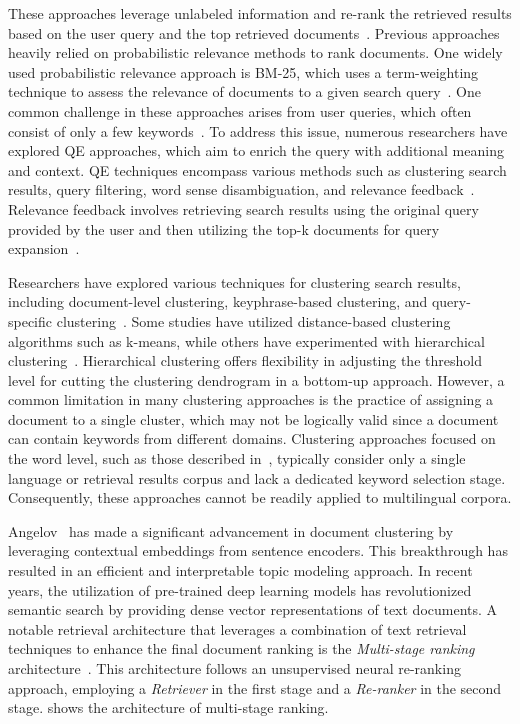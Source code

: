 These approaches leverage unlabeled information and re-rank the retrieved results based on the user query and the top retrieved documents~\cite{rohatgi2020psu, azad2019query}. Previous approaches heavily relied on probabilistic relevance methods to rank documents. One widely used probabilistic relevance approach is BM-25, which uses a term-weighting technique to assess the relevance of documents to a given search query~\cite{robertson2009probabilistic}. One common challenge in these approaches arises from user queries, which often consist of only a few keywords~\cite{azad2019query, Kankaria2015QueryET}. To address this issue, numerous researchers have explored \ac{QE} approaches, which aim to enrich the query with additional meaning and context. \ac{QE} techniques encompass various methods such as clustering search results, query filtering, word sense disambiguation, and relevance feedback~\cite{azad2019query}. Relevance feedback involves retrieving search results using the original query provided by the user and then utilizing the top-k documents for query expansion~\cite{azad2019query}.

Researchers have explored various techniques for clustering search results, including document-level clustering, keyphrase-based clustering, and query-specific clustering~\cite{bernardini2009full, kurland2008rank, zamir1998web, osinski2005concept, liu2004cluster, liu2006representing}. Some studies have utilized distance-based clustering algorithms such as k-means, while others have experimented with hierarchical clustering~\cite{bernardini2009full, mehlitz2007new, yuan2022measurement}. Hierarchical clustering offers flexibility in adjusting the threshold level for cutting the clustering dendrogram in a bottom-up approach. However, a common limitation in many clustering approaches is the practice of assigning a document to a single cluster, which may not be logically valid since a document can contain keywords from different domains. Clustering approaches focused on the word level, such as those described in~\cite{bernardini2009full, mehlitz2007new}, typically consider only a single language or retrieval results corpus and lack a dedicated keyword selection stage. Consequently, these approaches cannot be readily applied to multilingual corpora.

Angelov~\cite{angelov2020top2vec} has made a significant advancement in document clustering by leveraging contextual embeddings from sentence encoders. This breakthrough has resulted in an efficient and interpretable topic modeling approach. In recent years, the utilization of pre-trained deep learning models has revolutionized semantic search by providing dense vector representations of text documents. A notable retrieval architecture that leverages a combination of text retrieval techniques to enhance the final document ranking is the \emph{Multi-stage ranking} architecture~\cite{yates2021pretrained, anand2021serverless, nogueira2019passage}. This architecture follows an unsupervised neural re-ranking approach, employing a \emph{Retriever} in the first stage and a \emph{Re-ranker} in the second stage.  shows the architecture of multi-stage ranking. 


